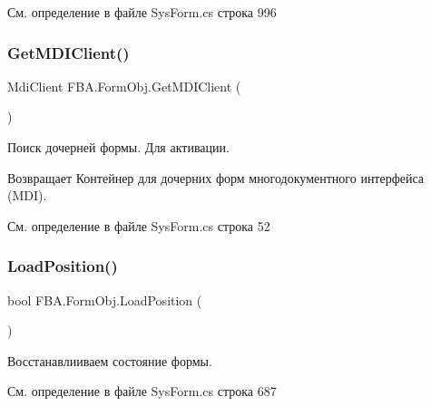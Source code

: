 См. определение в файле Sys\+Form.\+cs строка 996

\mbox{\label{class_f_b_a_1_1_form_obj_a922fdb209cda85aba595c2c5d53a1e1a}} 
\subsubsection{\texorpdfstring{Get\+M\+D\+I\+Client()}{GetMDIClient()}}
{\footnotesize\ttfamily Mdi\+Client F\+B\+A.\+Form\+Obj.\+Get\+M\+D\+I\+Client (\begin{DoxyParamCaption}{ }\end{DoxyParamCaption})}



Поиск дочерней формы. Для активации. 

\begin{DoxyReturn}{Возвращает}
Контейнер для дочерних форм многодокументного интерфейса (M\+DI).
\end{DoxyReturn}


См. определение в файле Sys\+Form.\+cs строка 52

\mbox{\label{class_f_b_a_1_1_form_obj_a056a98f36a377ae1299cb8b6dcfd9984}} 
\subsubsection{\texorpdfstring{Load\+Position()}{LoadPosition()}}
{\footnotesize\ttfamily bool F\+B\+A.\+Form\+Obj.\+Load\+Position (\begin{DoxyParamCaption}{ }\end{DoxyParamCaption})}



Восстанавлииваем состояние формы. 



См. определение в файле Sys\+Form.\+cs строка 687

\mbox{\label{class_f_b_a_1_1_form_obj_abc70df0d5f5e20245f4903505a559042}} 
